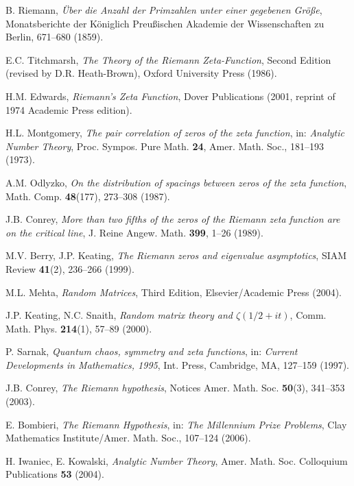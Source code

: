 \documentclass[12pt]{article}
\theoremstyle{plain}
\theoremstyle{definition}
\begin{document}
\begin{thebibliography}{99}

 B. Riemann, \emph{Über die Anzahl der Primzahlen unter einer gegebenen Größe}, Monatsberichte der Königlich Preußischen Akademie der Wissenschaften zu Berlin, 671--680 (1859).

 E.C. Titchmarsh, \emph{The Theory of the Riemann Zeta-Function}, Second Edition (revised by D.R. Heath-Brown), Oxford University Press (1986).

 H.M. Edwards, \emph{Riemann's Zeta Function}, Dover Publications (2001, reprint of 1974 Academic Press edition).

 H.L. Montgomery, \emph{The pair correlation of zeros of the zeta function}, in: \emph{Analytic Number Theory}, Proc. Sympos. Pure Math. \textbf{24}, Amer. Math. Soc., 181--193 (1973).

 A.M. Odlyzko, \emph{On the distribution of spacings between zeros of the zeta function}, Math. Comp. \textbf{48}(177), 273--308 (1987).

 J.B. Conrey, \emph{More than two fifths of the zeros of the Riemann zeta function are on the critical line}, J. Reine Angew. Math. \textbf{399}, 1--26 (1989).

 M.V. Berry, J.P. Keating, \emph{The Riemann zeros and eigenvalue asymptotics}, SIAM Review \textbf{41}(2), 236--266 (1999).

 M.L. Mehta, \emph{Random Matrices}, Third Edition, Elsevier/Academic Press (2004).

 J.P. Keating, N.C. Snaith, \emph{Random matrix theory and $\zeta(1/2+it)$}, Comm. Math. Phys. \textbf{214}(1), 57--89 (2000).

 P. Sarnak, \emph{Quantum chaos, symmetry and zeta functions}, in: \emph{Current Developments in Mathematics, 1995}, Int. Press, Cambridge, MA, 127--159 (1997).

 J.B. Conrey, \emph{The Riemann hypothesis}, Notices Amer. Math. Soc. \textbf{50}(3), 341--353 (2003).

 E. Bombieri, \emph{The Riemann Hypothesis}, in: \emph{The Millennium Prize Problems}, Clay Mathematics Institute/Amer. Math. Soc., 107--124 (2006).

 H. Iwaniec, E. Kowalski, \emph{Analytic Number Theory}, Amer. Math. Soc. Colloquium Publications \textbf{53} (2004).


\end{thebibliography}
\end{document}
